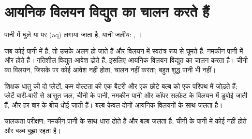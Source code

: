 \section{आयनिक विलयन विद्युत का चालन करते हैं}

\begin{notation}[अवस्था-संकेत (aq)]\label{not:g9:ions:aq}
पानी में घुले  या  पर (aq) लगाया जाता है, यानी जलीय:
, ।
\end{notation}

\begin{proposition}\label{prop:g9:ions:conduct}
जब कोई  पानी में  है, तो उसके  अलग हो जाते हैं और विलयन
में स्वतंत्र रूप से घूमते हैं: नमकीन पानी में  और
 होते हैं। गतिशील  विद्युत आवेश ढोते हैं, इसलिए आयनिक विलयन
विद्युत का चालन करता है। चीनी का विलयन, जिसके  पर कोई आवेश नहीं होता,
चालन नहीं करता; बहुत शुद्ध पानी भी नहीं।
\end{proposition}

\begin{inthelab}[कौन-से द्रव चालन करते हैं?]
शिक्षक धातु की दो प्लेटों, कम वोल्टता की एक बैटरी और एक छोटे बल्ब को एक
परिपथ में जोड़ते हैं; प्लेटें बारी-बारी से आसुत जल, चीनी के पानी, नमकीन पानी
और कॉपर सल्फ़ेट के विलयन में डुबोई जाती हैं, और हर बार के बीच धोई जाती हैं।
बल्ब केवल दोनों आयनिक विलयनों के साथ जलता है।
\end{inthelab}

\begin{omfigure}

{\small चालकता परीक्षण: नमकीन पानी के साथ  धारा ढोते हैं और बल्ब जलता
है; चीनी के पानी में कोई  नहीं होते और बल्ब बुझा
रहता है।}
\end{omfigure}

